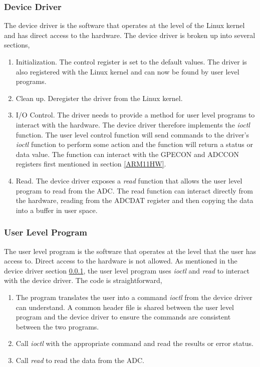\documentclass[10pt,conference]{IEEEtran}
\begin{document}
\subsubsection{Device Driver}\label{DeviceDriver}
The device driver is the software that operates at the level of the Linux kernel and has direct access to the hardware. The device driver is broken up into several sections,
\begin{enumerate}
	\item Initialization. The control register is set to the default values. The driver is also registered with the Linux kernel and can now be found by user level programs.
	\item Clean up. Deregister the driver from the Linux kernel.
	\item I/O Control. The driver needs to provide a method for user level programs to interact with the hardware. The device driver therefore implements the \emph{ioctl} function. The user level control function will send commands to the driver's \emph{ioctl} function to perform some action and the function will return a status or data value. The function can interact with the GPECON and ADCCON registers first mentioned in section \ref{ARM11HW}. 
	\item Read. The device driver exposes a \emph{read} function that allows the user level program to read from the ADC. The read function can interact directly from the hardware, reading from the ADCDAT register and then copying the data into a buffer in user space.
\end{enumerate}


\subsubsection{User Level Program}
The user level program is the software that operates at the level that the user has access to.  Direct access to the hardware is not allowed. As mentioned in the device driver section \ref{DeviceDriver}, the user level program uses \emph{ioctl} and \emph{read} to interact with the device driver. The code is straightforward,
\begin{enumerate}
	\item The program translates the user into a command \emph{ioctl} from the device driver can understand. A common header file is shared between the user level program and the device driver to ensure the commands are consistent between the two programs.
	\item Call \emph{ioctl} with the appropriate command and read the results or error status.
	\item Call \emph{read} to read the data from the ADC.
\end{enumerate}
\end{document}
